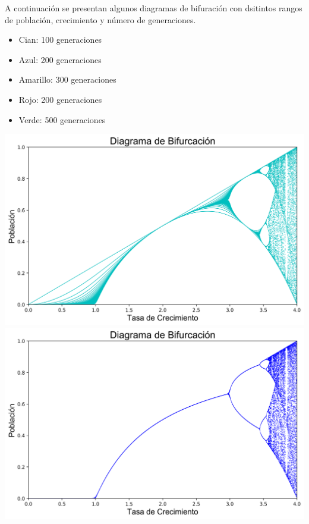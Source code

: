 \documentclass[11pt]{article}
\begin{document}
A continuación se presentan algunos diagramas de bifuración con dsitintos rangos de población, crecimiento y número de generaciones.

\begin{itemize}
\item Cian: 100 generaciones
\item Azul: 200 generaciones
\item Amarillo: 300 generaciones
\item Rojo: 200 generaciones
\item Verde: 500 generaciones
\end{itemize}

\vspace{1cm}

\includegraphics[scale=0.37]{logistic-map-bifurcation-0.png} \hspace{0.01cm} \includegraphics[scale=0.37]{logistic-map-bifurcation-1.png}

\vspace{1.2cm}
\end{document}

